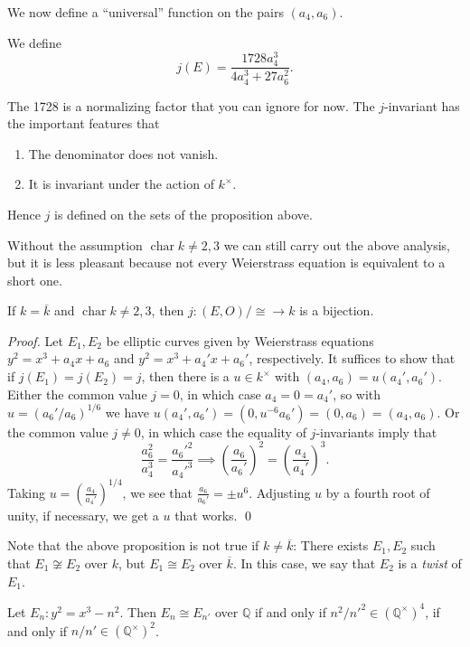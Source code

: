 We now define a ``universal'' function on the pairs \( (a_4,a_6) \).
\begin{definition}[\( j \)-invariant]
  We define
  \[ j(E) = \frac{1728 a_4^3}{4a_4^3 + 27 a_6^2} . \]
\end{definition}
The 1728 is a normalizing factor that you can ignore for now.
The \( j \)-invariant has the important features that
\begin{enumerate}
\item The denominator does not vanish.
\item It is invariant under the action of \( k^\times \).
\end{enumerate}
Hence \( j \) is defined on the sets of the proposition above.
\begin{remark}
Without the assumption \( \operatorname{char} k \neq 2,3 \) we can still carry out the above analysis, but it is less pleasant because not every Weierstrass equation is equivalent to a short one.
\end{remark}
\begin{proposition}
  If \( k = \overline{k} \) and \( \operatorname{char} k \neq 2,3 \), then
  \( j \colon \left( E,O \right) / \cong \to k \)
  is a bijection.
\end{proposition}
\textit{Proof.}
Let \( E_1, E_2 \) be elliptic curves given by Weierstrass equations \( y^2 = x^3 + a_4 x + a_6 \) and \( y^2 = x^3 + a_4' x + a_6' \), respectively.
It suffices to show that if \( j(E_1) = j(E_2) = j \), then there is a \( u \in k^\times \) with \( (a_4,a_6) = u(a_4',a_6') \).
Either the common value \( j = 0 \), in which case \( a_4 = 0 = a_4' \), so with \( u = \left( a_6'/a_6 \right)^{ 1/6} \) we have \( u (a_4',a_6') = (0,u^{-6} a_6') = (0,a_6) = (a_4,a_6) \).
Or the common value \( j \neq 0 \), in which case the equality of \( j \)-invariants imply that
\[ \frac{a_6^2}{a_4^3} = \frac{a_6'^2}{a_4'^3} \implies \left( \frac{a_6}{a_6'} \right)^2 = \left( \frac{a_4}{a_4'} \right)^3 . \]
Taking \( u = \left( \frac{a_4}{a_4'} \right)^{1/4} \), we see that \( \frac{a_6}{a_6'} = \pm u^6 \).
Adjusting \( u \) by a fourth root of unity, if necessary, we get a \( u \) that works.
\qed

Note that the above proposition is not true if \( k \neq \overline{k} \):
There exists \( E_1, E_2 \) such that \( E_1 \not\cong E_2 \) over \( k \), but \( E_1 \cong E_2  \) over \( \overline{k} \).
In this case, we say that \( E_2 \) is a \textit{twist} of \( E_1 \).
\begin{example}
  Let \( E_n : y^2 = x^3 - n^2 \).
  Then \( E_n \cong E_{n'} \) over \( \mathbb{Q} \) if and only if \( n^2/ n'^2 \in \left( \mathbb{Q}^\times \right)^4 \), if and only if \( n / n' \in \left( \mathbb{Q}^\times \right)^2 \).
\end{example}

